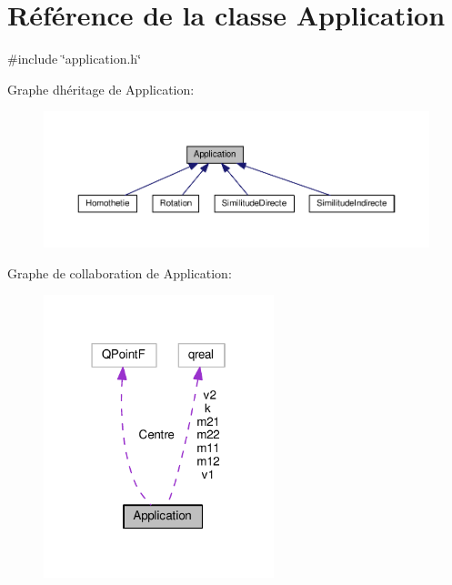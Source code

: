 \hypertarget{class_application}{}\section{Référence de la classe Application}
\label{class_application}


{\ttfamily \#include \char`\"{}application.\+h\char`\"{}}



Graphe d\textquotesingle{}héritage de Application\+:\nopagebreak
\begin{figure}[H]
\begin{center}
\leavevmode
\includegraphics[width=350pt]{class_application__inherit__graph}
\end{center}
\end{figure}


Graphe de collaboration de Application\+:\nopagebreak
\begin{figure}[H]
\begin{center}
\leavevmode
\includegraphics[width=190pt]{class_application__coll__graph}
\end{center}
\end{figure}
